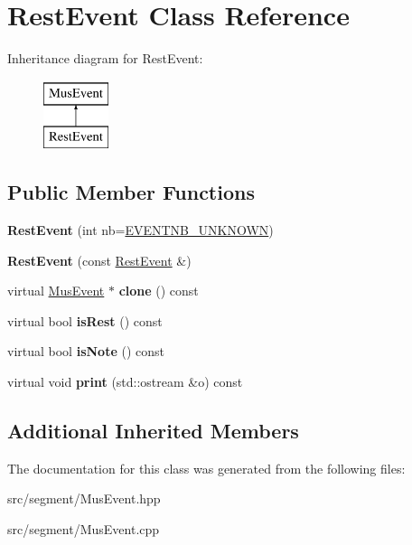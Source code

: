 \hypertarget{classRestEvent}{}\section{Rest\+Event Class Reference}
\label{classRestEvent}
Inheritance diagram for Rest\+Event\+:\begin{figure}[H]
\begin{center}
\leavevmode
\includegraphics[height=2.000000cm]{classRestEvent}
\end{center}
\end{figure}
\subsection*{Public Member Functions}
\begin{DoxyCompactItemize}
\item 
{\bfseries Rest\+Event} (int nb=\mbox{\hyperlink{group__general_gac3b19762b16f33de03662fd4289fe5a9}{E\+V\+E\+N\+T\+N\+B\+\_\+\+U\+N\+K\+N\+O\+WN}})
\item 
{\bfseries Rest\+Event} (const \mbox{\hyperlink{classRestEvent}{Rest\+Event}} \&)
\item 
virtual \mbox{\hyperlink{classMusEvent}{Mus\+Event}} $\ast$ {\bfseries clone} () const
\item 
\mbox{\label{classRestEvent_a801a4ea729f7b83b38214f230a50ea6c}} 
virtual bool {\bfseries is\+Rest} () const
\item 
\mbox{\label{classRestEvent_a0f4dc932de332e0ae7014e4fade5e26c}} 
virtual bool {\bfseries is\+Note} () const
\item 
virtual void {\bfseries print} (std\+::ostream \&o) const
\end{DoxyCompactItemize}
\subsection*{Additional Inherited Members}


The documentation for this class was generated from the following files\+:\begin{DoxyCompactItemize}
\item 
src/segment/Mus\+Event.\+hpp\item 
src/segment/Mus\+Event.\+cpp\end{DoxyCompactItemize}
